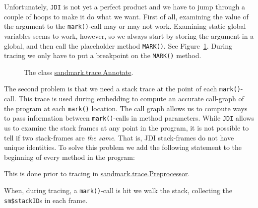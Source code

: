 Unfortunately, {\tt JDI} is not yet a perfect product and
we have to jump through a couple of hoops to make it do
what we want. First of all, examining the value of the
argument to the {\tt mark()}-call may or may not work.
Examining static global variables seems to work, however,
so we always start by storing the argument in a global,
and then call the placeholder method {\tt MARK()}. See
Figure~\ref{Annotate.java}. During tracing we only have
to put a breakpoint on the {\tt MARK()} method.

\begin{figure}
\caption{The class \protect\url{sandmark.trace.Annotate}.}
\label{Annotate.java}
\end{figure}

The second problem is that we need a stack trace at
the point of each {\tt mark()}-call. This trace is
used during embedding to compute an accurate call-graph 
of the program at each {\tt mark()} location. The call 
graph allows us to compute ways to pass information 
between {\tt mark()}-calls in method parameters.
While {\tt JDI} allows us to examine the stack frames
at any point in the program, it is not possible to
tell if two stack-frames are {\em the same}. That is,
JDI stack-frames do not have unique identities. To
solve this problem we add the following statement
to the beginning of every method in the program:
This is done prior to tracing in \url{sandmark.trace.Preprocessor}.

When, during tracing, a {\tt mark()}-call is hit we 
walk the stack, collecting the {\tt sm\$stackID}s in
each frame.

